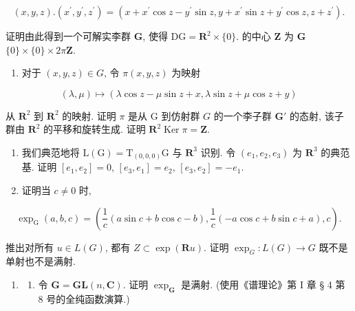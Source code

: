 \[
(x, y, z). (x ^ {\prime}, y ^ {\prime}, z ^ {\prime}) = (x + x ^ {\prime} \cos z - y ^ {\prime} \sin z, y + x ^ {\prime} \sin z + y ^ {\prime} \cos z, z + z ^ {\prime}).
\]

证明由此得到一个可解实李群 \(\mathbf{G}\), 使得 \(\mathrm{DG} = \mathbf{R}^2\times \{0\}\).  的中心 \(\mathbf{Z}\) 为 \(\mathbf{G}\)\(\{0\} \times \{0\} \times 2\pi \mathbf{Z}\).

\begin{enumerate}
\def\labelenumi{(\alph{enumi})}
\setcounter{enumi}{1}
\tightlist
\item
  对于 \((x,y,z)\in G\), 令 \(\pi (x,y,z)\) 为映射
\end{enumerate}

\[
(\lambda , \mu) \mapsto (\lambda \cos z - \mu \sin z + x, \lambda \sin z + \mu \cos z + y)
\]

从 \(\mathbf{R}^2\) 到 \(\mathbf{R}^2\) 的映射. 证明 \(\pi\) 是从 G 到仿射群 \(G\) 的一个李子群 \(\mathbf{G}'\) 的态射, 该子群由 \(\mathbf{R}^2\) 的平移和旋转生成. 证明 \(\mathbf{R}^2\)\(\operatorname{Ker} \pi = \mathbf{Z}\).

\begin{enumerate}
\def\labelenumi{(\alph{enumi})}
\setcounter{enumi}{2}
\item
  我们典范地将 \(\mathrm{L}(\mathrm{G}) = \mathrm{T}_{(0,0,0)}\mathrm{G}\) 与 \(\mathbf{R}^3\) 识别. 令 \((e_1, e_2, e_3)\) 为 \(\mathbf{R}^3\) 的典范基. 证明 \([e_1, e_2] = 0\), \([e_3, e_1] = e_2\), \([e_3, e_2] = -e_1\).
\item
  证明当 \(c \neq 0\) 时,
\end{enumerate}

\[
\exp_ {\mathrm{G}} (a, b, c) = \left(\frac {1}{c} (a \sin c + b \cos c - b), \frac {1}{c} (- a \cos c + b \sin c + a), c\right).
\]

推出对所有 \(u \in L(G)\), 都有 \(Z \subset \exp(\mathbf{R}u)\). 证明 \(\exp_G: L(G) \to G\) 既不是单射也不是满射.

\begin{enumerate}
\def\labelenumi{\arabic{enumi}.}
\setcounter{enumi}{13}
\tightlist
\item
  \begin{enumerate}
  \def\labelenumii{(\alph{enumii})}
  \tightlist
  \item
    令 \(\mathbf{G} = \mathbf{GL}(n, \mathbf{C})\). 证明 \(\exp_{\mathbf{G}}\) 是满射. (使用《谱理论》第 I 章 § 4 第 8 号的全纯函数演算.)
  \end{enumerate}
\end{enumerate}

